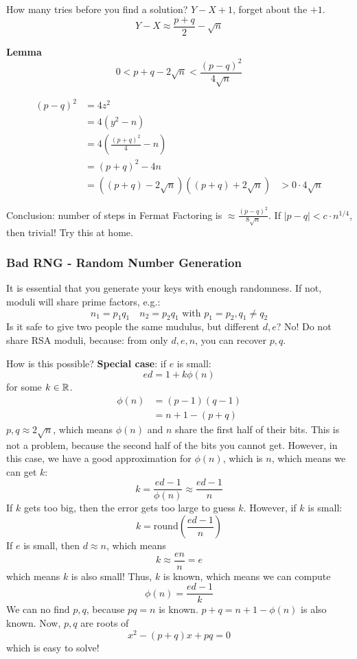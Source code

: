 \documentclass[language=english,number=]{homework}
\begin{document}
    How many tries before you find a solution?
    $Y - X + 1$, forget about the $+1$.
    \[
        Y - X \approx \frac{p+q}{2} - \sqrt{n}
    \]

    \textbf{Lemma}
    \[
        0 < p+q - 2 \sqrt{n} < \frac{(p-q)^2}{4 \sqrt n}
    \]

    \begin{align*}
        (p-q)^2 &= 4 z^2 \\
        &= 4(y^2 - n) \\
        &= 4 (  \frac{(p+q)^2}{4} - n ) \\
        &= (p+q)^2 - 4n \\
        &= ((p+q) - 2 \sqrt{n} ) ((p+q) + 2 \sqrt{n})
        &> 0 \cdot 4 \sqrt{n}
    \end{align*}

    Conclusion: number of steps in Fermat Factoring is $\approx \frac{(p-q)^2}{8 \sqrt{n}}$.
    If $|p-q| < c \cdot n^{1/4}$, then trivial!
    Try this at home.

    \subsubsection{Bad RNG - Random Number Generation}

    It is essential that you generate your keys with enough randomness.
    If not, moduli will share prime factors, e.g.:
    \[
        n_1 = p_1 q_1 \quad n_2 = p_2 q_1 \text{ with } p_1 = p_2, q_1 \ne q_2
    \]
    Is it safe to give two people the same mudulus, but different $d,e$?
    No!
    Do not share RSA moduli, because: from only $d,e,n$, you can recover $p,q$.

    How is this possible?
    \textbf{Special case}: if $e$ is small:
    \[
        ed = 1 + k \phi(n)
    \]
for some $k \in \mathbb{R}$.
    \begin{align*}
        \phi(n) &= (p-1)(q-1) \\
        &= n + 1 - (p+q)
    \end{align*}
    $p,q \approx 2 \sqrt n$, which means $\phi(n)$ and $n$ share the first half of their bits.
    This is not a problem, because the second half of the bits you cannot get.
    However, in this case, we have a good approximation for $\phi(n)$, which is $n$, which means we can get $k$:
    \[
        k = \frac{ed - 1}{\phi(n)} \approx \frac{ed-1}{n}
    \]
    If $k$ gets too big, then the error gets too large to guess $k$.
    However, if $k$ is small:
    \[
        k = \text{round}(\frac{ed-1}{n})
    \]
    If $e$ is small, then $d \approx n$, which means
    \[
        k \approx \frac{en}{n} = e
    \]
    which means $k$ is also small!
    Thus, $k$ is known, which means we can compute
    \[
        \phi(n) = \frac{ed-1}{k}
    \]
    We can no find $p,q$, because $pq=n$ is known.
$p+q = n+1 - \phi(n)$ is also known.
    Now, $p,q$ are roots of
    \[
        x^2 - (p+q)x + pq = 0
    \]
    which is easy to solve!
\end{document}
